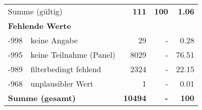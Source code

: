 \begin{longtable}{lXrrr}
     \midrule
     \multicolumn{2}{l}{Summe (gültig)} &
       \textbf{\num{111}} &
     \textbf{\num{100}} &
       \textbf{\num[round-mode=places,round-precision=2]{1.06}} \\
     \multicolumn{5}{l}{\textbf{Fehlende Werte}}\\
       -998 &
       keine Angabe &
         \num{29} &
        - &
         \num[round-mode=places,round-precision=2]{0.28} \\
       -995 &
       keine Teilnahme (Panel) &
         \num{8029} &
        - &
         \num[round-mode=places,round-precision=2]{76.51} \\
       -989 &
       filterbedingt fehlend &
         \num{2324} &
        - &
         \num[round-mode=places,round-precision=2]{22.15} \\
       -968 &
       unplausibler Wert &
         \num{1} &
        - &
         \num[round-mode=places,round-precision=2]{0.01} \\
     \midrule
     \multicolumn{2}{l}{\textbf{Summe (gesamt)}} &
          \textbf{\num{10494}} &
        \textbf{-} &
        \textbf{\num{100}} \\
     \bottomrule
     \end{longtable}
     
